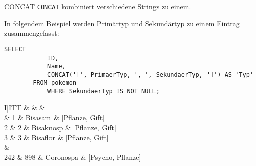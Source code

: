 \begin{sql}{CONCAT}
    \texttt{CONCAT} kombiniert verschiedene Strings zu einem.

    In folgendem Beispiel werden Primärtyp und Sekundärtyp zu einem Eintrag zusammengefasst:

    \begin{lstlisting}[language=mysql]
        SELECT
            ID,
            Name,
            CONCAT('[', PrimaerTyp, ', ', SekundaerTyp, ']') AS 'Typ'
        FROM pokemon
            WHERE SekundaerTyp IS NOT NULL;
    \end{lstlisting}

    \setcounter{rownum}{0}
    \begin{tabular}{I|ITT}
                                   &     &  &  \\                          & 1                         & Bisasam                  & [Pflanze, Gift]         \\
        2                          & 2                         & Bisaknosp                & [Pflanze, Gift]         \\
        3                          & 3                         & Bisaflor                 & [Pflanze, Gift]         \\
         &                                                       \\
        242                        & 898                       & Coronospa                & [Psycho, Pflanze]       \\
    \end{tabular}
\end{sql}

